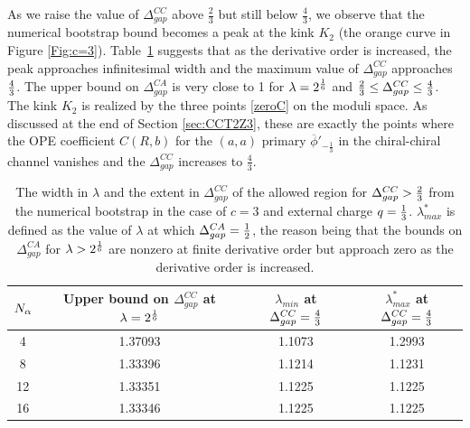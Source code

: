 \documentclass[12pt]{article}
\begin{document}
As we raise the value of $\Delta^{CC}_{gap}$ above $\frac23$ but still below $\frac43$, we observe that the numerical bootstrap bound becomes a peak at the kink $K_2$ (the orange curve in Figure \ref{Fig:c=3}).  Table~\ref{Tab:c=3-peak} suggests that as the derivative order is increased, the peak approaches infinitesimal width and the maximum value of $\Delta^{CC}_{gap}$ approaches $4 \over 3$.  The upper bound on $\Delta^{CA}_{gap}$ is very close to 1 for $\lambda = 2^{1\over6}$ and ${2 \over 3} \leq \Delta^{CC}_{gap} \leq {4 \over 3}$.  The kink $K_2$ is realized by the three points \eqref{zeroC} on the moduli space.  As discussed at the end of Section \ref{sec:CCT2Z3}, these are exactly the points where the OPE coefficient $C(R,b)$ for the $(a,a)$ primary $\overline\phi'_{-\frac13}$ in the chiral-chiral channel vanishes and the $\Delta^{CC}_{gap}$ increases to $\frac43$.%

\begin{table}
\centering
\begin{tabular}{|c|c|c|c|}
\hline
$N_{\alpha}$ & Upper bound on $\Delta_{gap}^{CC}$ at $\lambda = 2^{1\over6}$ & $\lambda_{min}$ at $\Delta_{gap}^{CC} = {4 \over 3}$ & $\lambda_{max}^*$ at $\Delta_{gap}^{CC} = {4 \over 3}$
\\\hline\hline
4 & 1.37093 & 1.1073 & 1.2993  \\
8 & 1.33396 & 1.1214 & 1.1231 \\
12 & 1.33351 & 1.1225 & 1.1225 \\
16 & 1.33346 & 1.1225 & 1.1225 \\\hline
\end{tabular}
\caption{The width in $\lambda$ and the extent in $\Delta_{gap}^{CC}$ of the allowed region for $\Delta_{gap}^{CC} > {2 \over 3}$ from the numerical bootstrap in the case of $c = 3$ and external charge $q = {1 \over 3}$.  $\lambda_{max}^*$ is defined as the value of $\lambda$ at which $\Delta_{gap}^{CA} = {1 \over 2}$, the reason being that the bounds on $\Delta_{gap}^{CA}$ for $\lambda > 2^{1\over6}$ are nonzero at finite derivative order but approach zero as the derivative order is increased.}
\label{Tab:c=3-peak}
\end{table}
\end{document}
